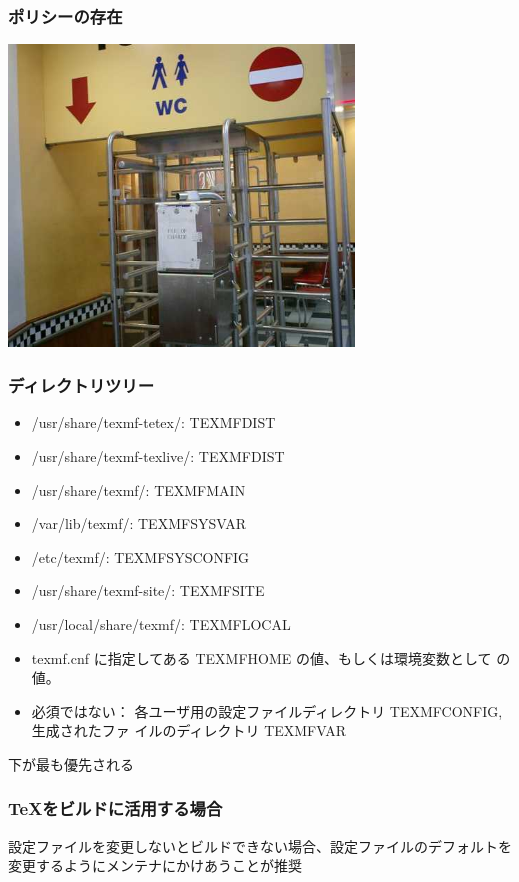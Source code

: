 \documentclass[cjk,dvipdfmx]{beamer}
\begin{document}
\begin{frame}
 \frametitle{ポリシーの存在}

\begin{center}
 \includegraphics[height=8cm]{image200604/toilet.png}
\end{center}
\end{frame}

\begin{frame}
 \frametitle{ディレクトリツリー}
\begin{itemize}
 \item /usr/share/texmf-tetex/:  TEXMFDIST
 \item /usr/share/texmf-texlive/: TEXMFDIST
 \item /usr/share/texmf/: TEXMFMAIN
 \item /var/lib/texmf/: TEXMFSYSVAR
 \item /etc/texmf/:  TEXMFSYSCONFIG
 \item /usr/share/texmf-site/: TEXMFSITE
 \item /usr/local/share/texmf/:  TEXMFLOCAL
 \item texmf.cnf に指定してある  TEXMFHOME の値、もしくは環境変数として
       の値。
 \item 必須ではない： 各ユーザ用の設定ファイルディレクトリ TEXMFCONFIG, 生成されたファ
       イルのディレクトリ TEXMFVAR
\end{itemize}
下が最も優先される
\end{frame}

\begin{frame}
\frametitle{TeXをビルドに活用する場合}

設定ファイルを変更しないとビルドできない場合、設定ファイルのデフォルトを
変更するようにメンテナにかけあうことが推奨

\end{frame}
\end{document}
